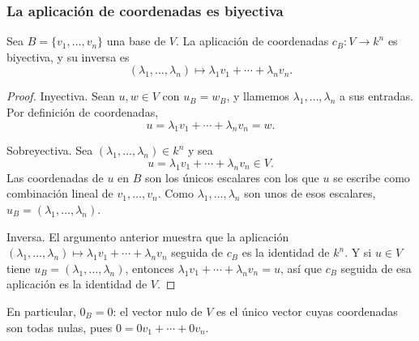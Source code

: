 \begin{frame}[allowframebreaks,t]
    \frametitle{La aplicación de coordenadas es biyectiva}

    \begin{proposition}
        Sea \(B=\{v_1,\ldots,v_n\}\) una base de \(V\). La aplicación
        de coordenadas \(c_B\colon V\to k^n\) es biyectiva, y su inversa es
        \[
            (\lambda_1,\ldots,\lambda_n)
            \longmapsto
            \lambda_1v_1+\cdots+\lambda_nv_n.
        \]
    \end{proposition}

    \begin{proof}
        \alert{Inyectiva.} Sean \(u,w\in V\) con \(u_B=w_B\), y llamemos
        \(\lambda_1,\ldots,\lambda_n\) a sus entradas. Por definición de
        coordenadas,
        \[
            u=\lambda_1v_1+\cdots+\lambda_nv_n=w.
        \]

        \alert{Sobreyectiva.} Sea
        \((\lambda_1,\ldots,\lambda_n) \in k^n\) y sea
        \[
            u=\lambda_1v_1+\cdots+\lambda_nv_n\in V.
        \]
        Las coordenadas de \(u\) en \(B\) son los \alert{únicos} escalares
        con los que \(u\) se escribe como combinación lineal de
        \(v_1,\ldots,v_n\). Como \(\lambda_1,\ldots,\lambda_n\) son unos
        de esos escalares, \(u_B=(\lambda_1,\ldots,\lambda_n) \).

        \framebreak

        \alert{Inversa.} El argumento anterior muestra que la aplicación
        \((\lambda_1,\ldots,\lambda_n) \mapsto\lambda_1v_1+\cdots+\lambda_nv_n\)
        seguida de \(c_B\) es la identidad de \(k^n\). Y si \(u\in V\)
        tiene \(u_B=(\lambda_1,\ldots,\lambda_n) \), entonces
        \(\lambda_1v_1+\cdots+\lambda_nv_n=u\), así que
        \(c_B\) seguida de esa aplicación es la identidad de \(V\).
    \end{proof}

    \medskip

    En particular, \(0_B=0\): el vector nulo de \(V\) es el único vector
    cuyas coordenadas son todas nulas, pues \(0=0v_1+\cdots+0v_n\).
\end{frame}


